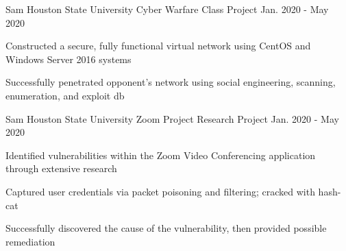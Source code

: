 
\begin{cventries}
	\cventry
	  {Sam Houston State University} %
  	  {Cyber Warfare} %
	  {Class Project} %
	  {Jan. 2020 - May 2020} %
	  {
	    \begin{cvitems} %
			\item {Constructed a secure, fully functional virtual network using CentOS and Windows Server 2016 systems}
			\item {Successfully penetrated opponent’s network using social engineering, scanning, enumeration, and exploit db}
		\end{cvitems}
	  }

	\cventry
	  {Sam Houston State University} %
      {Zoom Project} %
	  {Research Project} %
	  {Jan. 2020 - May 2020} %
	  {
	    \begin{cvitems} %
			\item {Identified vulnerabilities within the Zoom Video Conferencing application through extensive research}
			\item {Captured user credentials via packet poisoning and filtering; cracked with hash-cat}
			\item {Successfully discovered the cause of the vulnerability, then provided possible remediation }
		\end{cvitems}
	  }


\end{cventries}
